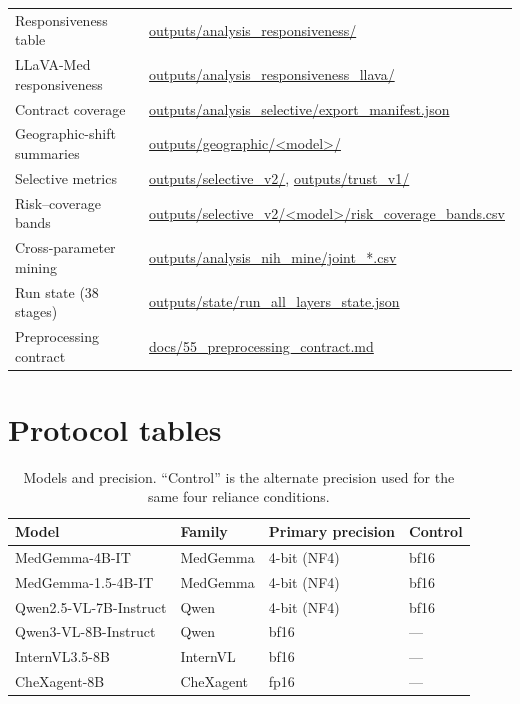 \begin{table}[H]
\begin{tabular}{ll}
Responsiveness table & \url{outputs/analysis_responsiveness/} \\
LLaVA-Med responsiveness & \url{outputs/analysis_responsiveness_llava/} \\
Contract coverage & \url{outputs/analysis_selective/export_manifest.json} \\
Geographic-shift summaries & \url{outputs/geographic/<model>/} \\
Selective metrics & \url{outputs/selective_v2/}, \url{outputs/trust_v1/} \\
Risk--coverage bands & \url{outputs/selective_v2/<model>/risk_coverage_bands.csv} \\
Cross-parameter mining & \url{outputs/analysis_nih_mine/joint_*.csv} \\
Run state (38 stages) & \url{outputs/state/run_all_layers_state.json} \\
Preprocessing contract & \url{docs/55_preprocessing_contract.md} \\
\bottomrule
\end{tabular}
\end{table}

\section{Protocol tables}
\label{app:protocol}

\begin{table}[H]
\centering
\small
\caption{Models and precision. ``Control'' is the alternate precision used for the same four reliance conditions.}
\label{tab:models}
\begin{tabular}{llll}
\toprule
Model & Family & Primary precision & Control \\
\midrule
MedGemma-4B-IT & MedGemma & 4-bit (NF4) & bf16 \\
MedGemma-1.5-4B-IT & MedGemma & 4-bit (NF4) & bf16 \\
Qwen2.5-VL-7B-Instruct & Qwen & 4-bit (NF4) & bf16 \\
Qwen3-VL-8B-Instruct & Qwen & bf16 & --- \\
InternVL3.5-8B & InternVL & bf16 & --- \\
CheXagent-8B & CheXagent & fp16 & --- \\
\bottomrule
\end{tabular}
\end{table}

